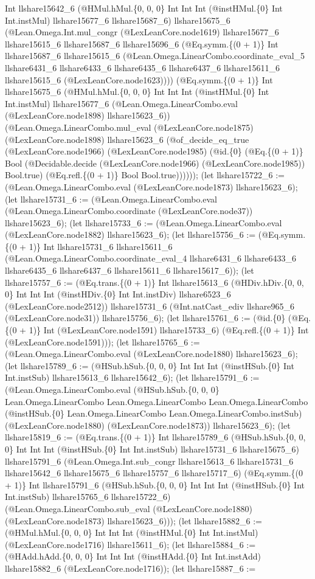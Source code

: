 \documentclass[11pt]{article}
\begin{document}
Int llshare15642\_6 (@HMul.hMul.\{0, 0, 0\} Int Int Int (@instHMul.\{0\} Int Int.instMul) llshare15677\_6 llshare15687\_6) llshare15675\_6 (@Lean.Omega.Int.mul\_congr (@LexLeanCore.node1619) llshare15677\_6 llshare15615\_6 llshare15687\_6 llshare15696\_6 (@Eq.symm.\{(0 + 1)\} Int llshare15687\_6 llshare15615\_6 (@Lean.Omega.LinearCombo.coordinate\_eval\_5 llshare6431\_6 llshare6433\_6 llshare6435\_6 llshare6437\_6 llshare15611\_6 llshare15615\_6 (@LexLeanCore.node1623)))) (@Eq.symm.\{(0 + 1)\} Int llshare15675\_6 (@HMul.hMul.\{0, 0, 0\} Int Int Int (@instHMul.\{0\} Int Int.instMul) llshare15677\_6 (@Lean.Omega.LinearCombo.eval (@LexLeanCore.node1898) llshare15623\_6)) (@Lean.Omega.LinearCombo.mul\_eval (@LexLeanCore.node1875) (@LexLeanCore.node1898) llshare15623\_6 (@of\_decide\_eq\_true (@LexLeanCore.node1966) (@LexLeanCore.node1985) (@id.\{0\} (@Eq.\{(0 + 1)\} Bool (@Decidable.decide (@LexLeanCore.node1966) (@LexLeanCore.node1985)) Bool.true) (@Eq.refl.\{(0 + 1)\} Bool Bool.true)))))); (let llshare15722\_6 := (@Lean.Omega.LinearCombo.eval (@LexLeanCore.node1873) llshare15623\_6); (let llshare15731\_6 := (@Lean.Omega.LinearCombo.eval (@Lean.Omega.LinearCombo.coordinate (@LexLeanCore.node37)) llshare15623\_6); (let llshare15733\_6 := (@Lean.Omega.LinearCombo.eval (@LexLeanCore.node1882) llshare15623\_6); (let llshare15756\_6 := (@Eq.symm.\{(0 + 1)\} Int llshare15731\_6 llshare15611\_6 (@Lean.Omega.LinearCombo.coordinate\_eval\_4 llshare6431\_6 llshare6433\_6 llshare6435\_6 llshare6437\_6 llshare15611\_6 llshare15617\_6)); (let llshare15757\_6 := (@Eq.trans.\{(0 + 1)\} Int llshare15613\_6 (@HDiv.hDiv.\{0, 0, 0\} Int Int Int (@instHDiv.\{0\} Int Int.instDiv) llshare6523\_6 (@LexLeanCore.node2512)) llshare15731\_6 (@Int.natCast\_ediv llshare965\_6 (@LexLeanCore.node31)) llshare15756\_6); (let llshare15761\_6 := (@id.\{0\} (@Eq.\{(0 + 1)\} Int (@LexLeanCore.node1591) llshare15733\_6) (@Eq.refl.\{(0 + 1)\} Int (@LexLeanCore.node1591))); (let llshare15765\_6 := (@Lean.Omega.LinearCombo.eval (@LexLeanCore.node1880) llshare15623\_6); (let llshare15789\_6 := (@HSub.hSub.\{0, 0, 0\} Int Int Int (@instHSub.\{0\} Int Int.instSub) llshare15613\_6 llshare15642\_6); (let llshare15791\_6 := (@Lean.Omega.LinearCombo.eval (@HSub.hSub.\{0, 0, 0\} Lean.Omega.LinearCombo Lean.Omega.LinearCombo Lean.Omega.LinearCombo (@instHSub.\{0\} Lean.Omega.LinearCombo Lean.Omega.LinearCombo.instSub) (@LexLeanCore.node1880) (@LexLeanCore.node1873)) llshare15623\_6); (let llshare15819\_6 := (@Eq.trans.\{(0 + 1)\} Int llshare15789\_6 (@HSub.hSub.\{0, 0, 0\} Int Int Int (@instHSub.\{0\} Int Int.instSub) llshare15731\_6 llshare15675\_6) llshare15791\_6 (@Lean.Omega.Int.sub\_congr llshare15613\_6 llshare15731\_6 llshare15642\_6 llshare15675\_6 llshare15757\_6 llshare15717\_6) (@Eq.symm.\{(0 + 1)\} Int llshare15791\_6 (@HSub.hSub.\{0, 0, 0\} Int Int Int (@instHSub.\{0\} Int Int.instSub) llshare15765\_6 llshare15722\_6) (@Lean.Omega.LinearCombo.sub\_eval (@LexLeanCore.node1880) (@LexLeanCore.node1873) llshare15623\_6))); (let llshare15882\_6 := (@HMul.hMul.\{0, 0, 0\} Int Int Int (@instHMul.\{0\} Int Int.instMul) (@LexLeanCore.node1716) llshare15611\_6); (let llshare15884\_6 := (@HAdd.hAdd.\{0, 0, 0\} Int Int Int (@instHAdd.\{0\} Int Int.instAdd) llshare15882\_6 (@LexLeanCore.node1716)); (let llshare15887\_6 := 
\end{document}
